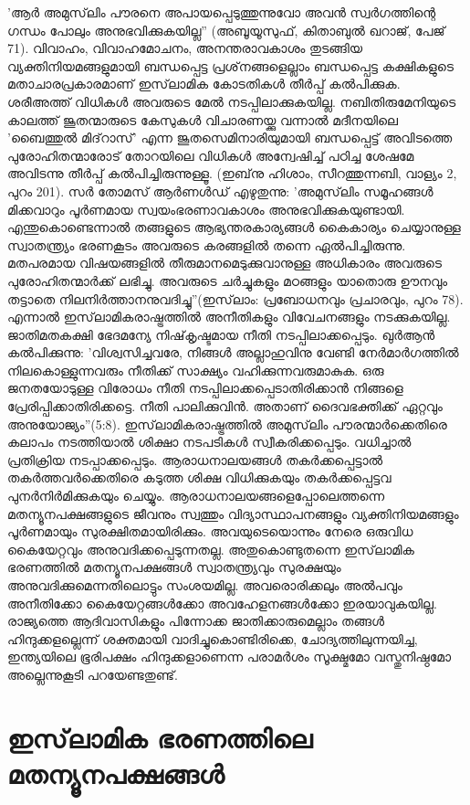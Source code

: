 'ആര്‍ അമുസ്‌ലിം പൗരനെ അപായപ്പെടുത്തുന്നുവോ അവന്‍ സ്വര്‍ഗത്തിന്റെ ഗന്ധം പോലും അനുഭവിക്കുകയില്ല'' (അബൂയൂസുഫ്, കിതാബുല്‍ ഖറാജ്, പേജ് 71).
വിവാഹം, വിവാഹമോചനം, അനന്തരാവകാശം തുടങ്ങിയ വ്യക്തിനിയമങ്ങളുമായി ബന്ധപ്പെട്ട പ്രശ്‌നങ്ങളെല്ലാം ബന്ധപ്പെട്ട കക്ഷികളുടെ മതാചാരപ്രകാരമാണ് ഇസ്‌ലാമിക കോടതികള്‍ തീര്‍പ്പ് കല്‍പിക്കുക. ശരീഅത്ത് വിധികള്‍ അവരുടെ മേല്‍ നടപ്പിലാക്കുകയില്ല. നബിതിരുമേനിയുടെ കാലത്ത് ജൂതന്മാരുടെ കേസുകള്‍ വിചാരണയ്ക്കു വന്നാല്‍ മദീനയിലെ 'ബൈത്തുല്‍ മിദ്‌റാസ്' എന്ന ജൂതസെമിനാരിയുമായി ബന്ധപ്പെട്ട് അവിടത്തെ പുരോഹിതന്മാരോട് തോറയിലെ വിധികള്‍ അന്വേഷിച്ച് പഠിച്ച ശേഷമേ അവിടന്നു തീര്‍പ്പ് കല്‍പിച്ചിരുന്നുള്ളൂ. (ഇബ്‌നു ഹിശാം, സീറത്തുന്നബി, വാള്യം 2, പുറം 201).
സര്‍ തോമസ് ആര്‍ണള്‍ഡ് എഴുതുന്നു: 'അമുസ്‌ലിം സമൂഹങ്ങള്‍ മിക്കവാറും പൂര്‍ണമായ സ്വയംഭരണാവകാശം അനുഭവിക്കുകയുണ്ടായി. എന്തുകൊണ്ടെന്നാല്‍ തങ്ങളുടെ ആഭ്യന്തരകാര്യങ്ങള്‍ കൈകാര്യം ചെയ്യാനുള്ള സ്വാതന്ത്യ്രം ഭരണകൂടം അവരുടെ കരങ്ങളില്‍ തന്നെ ഏല്‍പിച്ചിരുന്നു. മതപരമായ വിഷയങ്ങളില്‍ തീരുമാനമെടുക്കുവാനുള്ള അധികാരം അവരുടെ പുരോഹിതന്മാര്‍ക്ക് ലഭിച്ചു. അവരുടെ ചര്‍ച്ചുകളും മഠങ്ങളും യാതൊരു ഊനവും തട്ടാതെ നിലനിര്‍ത്താനനുവദിച്ചു''(ഇസ്‌ലാം: പ്രബോധനവും പ്രചാരവും, പുറം 78).
എന്നാല്‍ ഇസ്‌ലാമികരാഷ്ട്രത്തില്‍ അനീതികളും വിവേചനങ്ങളും നടക്കുകയില്ല. ജാതിമതകക്ഷി ഭേദമന്യേ നിഷ്‌കൃഷ്ടമായ നീതി നടപ്പിലാക്കപ്പെടും. ഖുര്‍ആന്‍ കല്‍പിക്കുന്നു: 'വിശ്വസിച്ചവരേ, നിങ്ങള്‍ അല്ലാഹുവിനു വേണ്ടി നേര്‍മാര്‍ഗത്തില്‍ നിലകൊള്ളുന്നവരും നീതിക്ക് സാക്ഷ്യം വഹിക്കുന്നവരുമാകുക. ഒരു ജനതയോടുള്ള വിരോധം നീതി നടപ്പിലാക്കപ്പെടാതിരിക്കാന്‍ നിങ്ങളെ പ്രേരിപ്പിക്കാതിരിക്കട്ടെ. നീതി പാലിക്കുവിന്‍. അതാണ് ദൈവഭക്തിക്ക് ഏറ്റവും അനുയോജ്യം''(5:8).
ഇസ്‌ലാമികരാഷ്ട്രത്തില്‍ അമുസ്‌ലിം പൗരന്മാര്‍ക്കെതിരെ കലാപം നടത്തിയാല്‍ ശിക്ഷാ നടപടികള്‍ സ്വീകരിക്കപ്പെടും. വധിച്ചാല്‍ പ്രതിക്രിയ നടപ്പാക്കപ്പെടും. ആരാധനാലയങ്ങള്‍ തകര്‍ക്കപ്പെട്ടാല്‍ തകര്‍ത്തവര്‍ക്കെതിരെ കടുത്ത ശിക്ഷ വിധിക്കുകയും തകര്‍ക്കപ്പെട്ടവ പുനര്‍നിര്‍മിക്കുകയും ചെയ്യും. ആരാധനാലയങ്ങളെപ്പോലെത്തന്നെ മതന്യൂനപക്ഷങ്ങളുടെ ജീവനും സ്വത്തും വിദ്യാസ്ഥാപനങ്ങളും വ്യക്തിനിയമങ്ങളും പൂര്‍ണമായും സുരക്ഷിതമായിരിക്കും. അവയുടെയൊന്നും നേരെ ഒരുവിധ കൈയേറ്റവും അനുവദിക്കപ്പെടുന്നതല്ല. അതുകൊണ്ടുതന്നെ ഇസ്‌ലാമിക ഭരണത്തില്‍ മതന്യൂനപക്ഷങ്ങള്‍ സ്വാതന്ത്യ്രവും സുരക്ഷയും അനുവദിക്കുമെന്നതിലൊട്ടും സംശയമില്ല. അവരൊരിക്കലും അല്‍പവും അനീതിക്കോ കൈയേറ്റങ്ങള്‍ക്കോ അവഹേളനങ്ങള്‍ക്കോ ഇരയാവുകയില്ല.
രാജ്യത്തെ ആദിവാസികളും പിന്നോക്ക ജാതിക്കാരുമെല്ലാം തങ്ങള്‍ ഹിന്ദുക്കളല്ലെന്ന് ശക്തമായി വാദിച്ചുകൊണ്ടിരിക്കെ, ചോദ്യത്തിലുന്നയിച്ച, ഇന്ത്യയിലെ ഭൂരിപക്ഷം ഹിന്ദുക്കളാണെന്ന പരാമര്‍ശം സൂക്ഷ്മമോ വസ്തുനിഷ്ഠമോ അല്ലെന്നുകൂടി പറയേണ്ടതുണ്ട്.
\chapter{ഇസ്‌ലാമിക ഭരണത്തിലെ മതന്യൂനപക്ഷങ്ങള്‍ }
